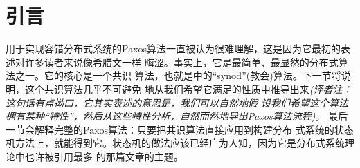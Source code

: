 \section{引言}

用于实现容错分布式系统的Paxos算法一直被认为很难理解，这是因为它最初的表述对许多读者来说像希腊文一样
晦涩\cite{lamport1998parttime}。事实上，它是最简单、最显然的分布式算法之一。它的核心是一个共识
算法，也就是\cite{lamport1998parttime}中的“synod”(教会)算法。下一节将说明，这个共识算法几乎不可避免
地从我们希望它满足的性质中推导出来\emph{(译者注：这句话有点拗口，它其实表述的意思是，我们可以自然地假
设我们希望这个算法拥有某种“特性”，然后从这些特性分析，自然而然地导出Paxos算法流程)}。
最后一节会解释完整的Paxos算法：只要把共识算法直接应用到构建分布
式系统的状态机方法上，就能得到它。状态机的做法应该已经广为人知，因为它是分布式系统理论中也许被引用最多
的那篇文章\cite{lamport1978time}的主题。
